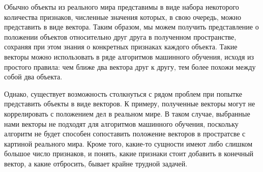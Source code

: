 \documentclass[times,specification,annotation]{itmo-student-thesis}
\begin{document}





\tableofcontents

\startprefacepage

Обычно объекты из реального мира представимы в виде набора некоторого
количества признаков, численные значения которых, в свою очередь, можно
представить в виде вектора. Таким образом, мы можем получить представление о
положении объектов относительно друг друга в полученном пространстве,
сохраняя при этом знания о конкретных признаках каждого объекта. Такие
векторы можно использовать в ряде алгоритмов машинного обучения, исходя из
простого правила: чем ближе два вектора друг к другу, тем более похожи между
собой два объекта.

Однако, существует возможность столкнуться с рядом проблем при попытке
представить объекты в виде векторов. К примеру, полученные векторы могут не
коррелировать с положением дел в реальном мире. В таком случае, выбранные
нами векторы не подходят для алгоритмов машинного обучения, поскольку
алгоритм не будет способен сопоставить положение векторов в простратсве с картиной
реального мира. Кроме того, какие-то сущности имеют либо слишком большое
число признаков, и понять, какие признаки стоит добавить в конечный вектор, а
какие отбросить, бывает крайне трудной задачей.
\end{document}
